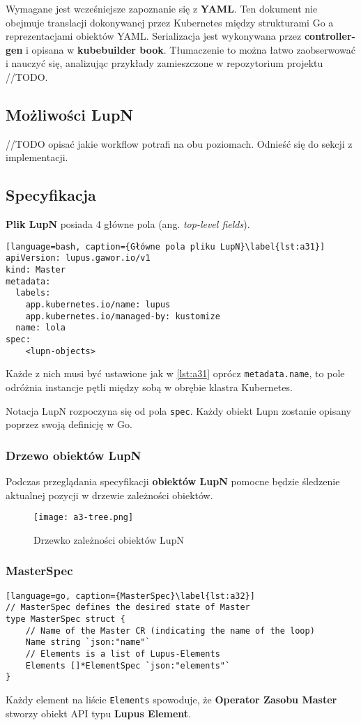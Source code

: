 Wymagane jest wcześniejsze zapoznanie się z \textbf{YAML}. Ten dokument nie obejmuje translacji dokonywanej przez Kubernetes między strukturami Go a reprezentacjami obiektów YAML. Serializacja jest wykonywana przez \textbf{controller-gen} i opisana w \textbf{kubebuilder book}. Tłumaczenie to można łatwo zaobserwować i nauczyć się, analizując przykłady zamieszczone w repozytorium projektu //TODO.

\subsection{Możliwości LupN}

//TODO opisać jakie workflow potrafi na obu poziomach. Odnieść się do sekcji z implementacji.

\subsection{Specyfikacja}

\textbf{Plik LupN} posiada 4 główne pola (ang. \textit{top-level fields}).

\begin{lstlisting}[language=bash, caption={Główne pola pliku LupN}\label{lst:a31}]
apiVersion: lupus.gawor.io/v1
kind: Master
metadata:
  labels:
    app.kubernetes.io/name: lupus
    app.kubernetes.io/managed-by: kustomize
  name: lola
spec:
	<lupn-objects>
\end{lstlisting}

Każde z nich musi być ustawione jak w \ref{lst:a31} oprócz \texttt{metadata.name}, to pole odróżnia instancje pętli między sobą w obrębie klastra Kubernetes.

Notacja LupN rozpoczyna się od pola \texttt{spec}. Każdy obiekt Lupn zostanie opisany poprzez swoją definicję w Go.

\subsubsection{Drzewo obiektów LupN}

Podczas przeglądania specyfikacji \textbf{obiektów LupN} pomocne będzie śledzenie aktualnej pozycji w drzewie zależności obiektów. 

\begin{figure}[!h]
    \centering \texttt{[image: a3-tree.png]}
    \caption{Drzewko zależności obiektów LupN}\label{fig:a3-tree}
\end{figure}

\subsubsection{MasterSpec}
\begin{lstlisting}[language=go, caption={MasterSpec}\label{lst:a32}]
// MasterSpec defines the desired state of Master
type MasterSpec struct {
	// Name of the Master CR (indicating the name of the loop)
	Name string `json:"name"`
	// Elements is a list of Lupus-Elements
	Elements []*ElementSpec `json:"elements"`
}
\end{lstlisting}
Każdy element na liście \texttt{Elements} spowoduje, że \textbf{Operator Zasobu Master} stworzy obiekt API typu \textbf{Lupus Element}. 

